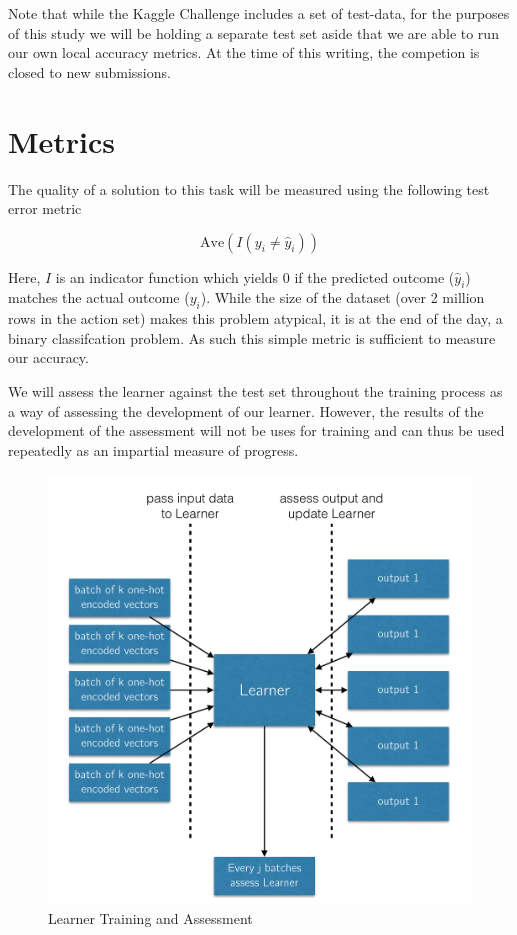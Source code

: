 \documentclass[]{report}
\begin{document}
Note that while the Kaggle Challenge includes a set of test-data, for
the purposes of this study we will be holding a separate test set aside
that we are able to run our own local accuracy metrics. At the time of
this writing, the competion is closed to new submissions.

\chapter{Metrics}\label{metrics}

The quality of a solution to this task will be measured using the
following test error metric

\[\text{Ave}(I(y_i\neq\hat{y}_i))\]

Here, \(I\) is an indicator function which yields 0 if the predicted
outcome (\(\hat{y}_i\)) matches the actual outcome (\(y_i\)). While the
size of the dataset (over 2 million rows in the action set) makes this
problem atypical, it is at the end of the day, a binary classifcation
problem. As such this simple metric is sufficient to measure our
accuracy.

We will assess the learner against the test set throughout the training
process as a way of assessing the development of our learner. However,
the results of the development of the assessment will not be uses for
training and can thus be used repeatedly as an impartial measure of
progress.

\begin{figure}[htbp]
\centering
\includegraphics{assets/img/learner_diagram.png}
\caption{Learner Training and Assessment}
\end{figure}
\end{document}
